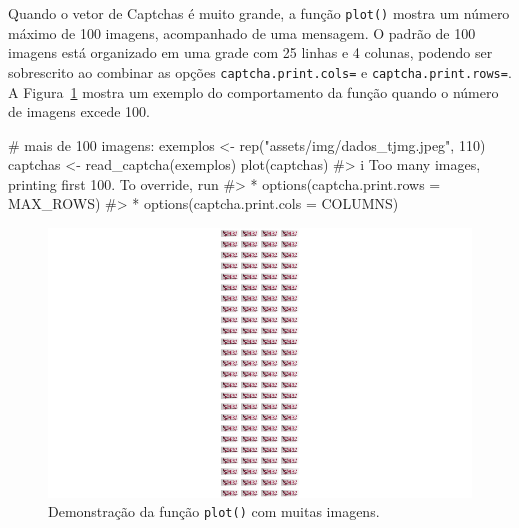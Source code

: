 \documentclass[12pt,twoside,brazilian]{book}
\newenvironment{Shaded}{\begin{snugshade}}{\end{snugshade}}
\newcommand{\CommentTok}[1]{\textcolor[rgb]{0.37,0.37,0.37}{#1}}
\newcommand{\DecValTok}[1]{\textcolor[rgb]{0.68,0.00,0.00}{#1}}
\newcommand{\FunctionTok}[1]{\textcolor[rgb]{0.28,0.35,0.67}{#1}}
\newcommand{\NormalTok}[1]{\textcolor[rgb]{0.00,0.23,0.31}{#1}}
\newcommand{\OtherTok}[1]{\textcolor[rgb]{0.00,0.23,0.31}{#1}}
\newcommand{\StringTok}[1]{\textcolor[rgb]{0.13,0.47,0.30}{#1}}
\begin{document}
Quando o vetor de Captchas é muito grande, a função \texttt{plot()}
mostra um número máximo de 100 imagens, acompanhado de uma mensagem. O
padrão de 100 imagens está organizado em uma grade com 25 linhas e 4
colunas, podendo ser sobrescrito ao combinar as opções
\texttt{captcha.print.cols=} e \texttt{captcha.print.rows=}. A
Figura~\ref{fig-exemplo-plot-multi-varias} mostra um exemplo do
comportamento da função quando o número de imagens excede 100.

\begin{Shaded}
\begin{Highlighting}[]
\CommentTok{\# mais de 100 imagens:}
\NormalTok{exemplos }\OtherTok{\textless{}{-}} \FunctionTok{rep}\NormalTok{(}\StringTok{"assets/img/dados\_tjmg.jpeg"}\NormalTok{, }\DecValTok{110}\NormalTok{)}
\NormalTok{captchas }\OtherTok{\textless{}{-}} \FunctionTok{read\_captcha}\NormalTok{(exemplos)}
\FunctionTok{plot}\NormalTok{(captchas)}
\CommentTok{\#\textgreater{} i Too many images, printing first 100. To override, run}
\CommentTok{\#\textgreater{} * options(\textquotesingle{}captcha.print.rows\textquotesingle{} = MAX\_ROWS)}
\CommentTok{\#\textgreater{} * options(\textquotesingle{}captcha.print.cols\textquotesingle{} = COLUMNS)}
\end{Highlighting}
\end{Shaded}

\begin{figure}[H]

{\centering \includegraphics{./resultados_files/figure-pdf/fig-exemplo-plot-multi-varias-1.pdf}

}

\caption{\label{fig-exemplo-plot-multi-varias}Demonstração da função
\texttt{plot()} com muitas imagens.}

\end{figure}
\end{document}
